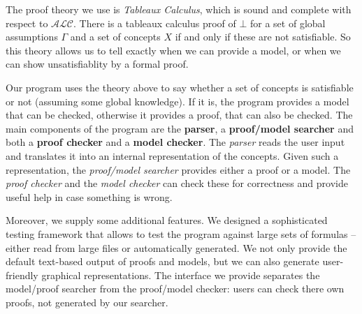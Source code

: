 The proof theory we use is \emph{Tableaux Calculus}, which is sound and complete
with respect to $\mathcal{ALC}$. There is a tableaux calculus proof of $\bot$ for
a set of global assumptions $\Gamma$ and a set of concepts $X$ if and only if these
are not satisfiable. So this theory allows us to tell exactly when we can provide
a model, or when we can show unsatisfiablity by a formal proof.

Our program uses the theory above to say whether a set of concepts is satisfiable or
not (assuming some global knowledge). If it is, the program provides a model that can
be checked, otherwise it provides a proof, that can also be checked. The main components
of the program are the \textbf{parser}, a \textbf{proof/model searcher} and
both a \textbf{proof checker} and a \textbf{model checker}. The \emph{parser} reads the
user input and translates it into an internal representation of the concepts. Given
such a representation, the \emph{proof/model searcher} provides either a proof or a
model. The \emph{proof checker} and the \emph{model checker} can check these for
correctness and provide useful help in case something is wrong.

Moreover, we supply some additional features.
We designed a sophisticated testing framework that allows to test the
program against large sets of formulas -- either read from large files or automatically
generated. We not only provide the default text-based output of proofs and models, but
we can also generate user-friendly graphical representations. The interface we provide
separates the model/proof searcher from the proof/model checker: users can check there
own proofs, not generated by our searcher.
